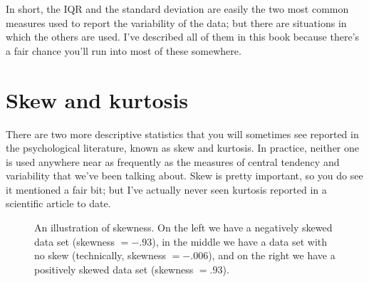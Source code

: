 \noindent
In short, the IQR and the standard deviation are easily the two most common measures used to report the variability of the data; but there are situations in which the others are used. I've described all of them in this book because there's a fair chance you'll run into most of these somewhere.

\section{Skew and kurtosis \label{sec:skew}\label{sec:kurtosis}}

There are two more descriptive statistics that you will sometimes see reported in the psychological literature, known as skew and kurtosis. In practice, neither one is used anywhere near as frequently as the measures of central tendency and variability that we've been talking about. Skew is pretty important, so you do see it mentioned a fair bit; but I've actually never seen kurtosis reported in a scientific article to date. 


\begin{figure}[ht]
\begin{center}
\caption{An illustration of skewness. On the left we have a negatively skewed data set (skewness $= -.93$), in the middle we have a data set with no skew (technically, skewness $= -.006$), and on the right we have a positively skewed data set (skewness $= .93$).  }
\label{fig:skewness}
\HR
\end{center}
\end{figure}

